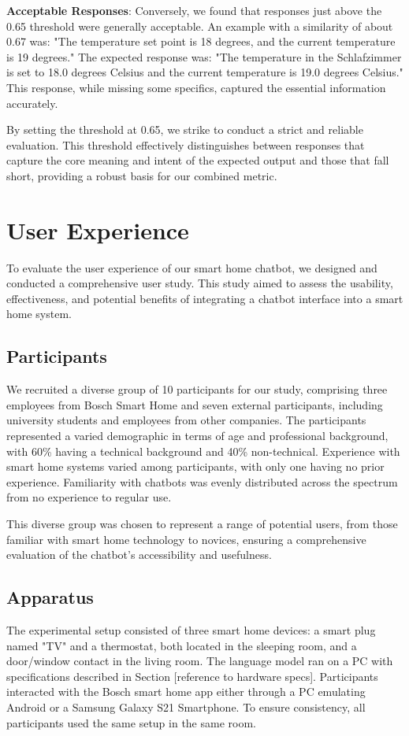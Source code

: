\textbf{Acceptable Responses}: Conversely, we found that responses just above the 0.65 threshold were generally acceptable. An example with a similarity of about 0.67 was: "The temperature set point is 18 degrees, and the current temperature is 19 degrees." The expected response was: "The temperature in the Schlafzimmer is set to 18.0 degrees Celsius and the current temperature is 19.0 degrees Celsius." This response, while missing some specifics, captured the essential information accurately.

By setting the threshold at 0.65, we strike to conduct a strict and reliable evaluation. This threshold effectively distinguishes between responses that capture the core meaning and intent of the expected output and those that fall short, providing a robust basis for our combined metric.



\section{User Experience}

To evaluate the user experience of our smart home chatbot, we designed and conducted a comprehensive user study. This study aimed to assess the usability, effectiveness, and potential benefits of integrating a chatbot interface into a smart home system.

\subsection{Participants}
We recruited a diverse group of 10 participants for our study, comprising three employees from Bosch Smart Home and seven external participants, including university students and employees from other companies. The participants represented a varied demographic in terms of age and professional background, with 60\% having a technical background and 40\% non-technical. Experience with smart home systems varied among participants, with only one having no prior experience. Familiarity with chatbots was evenly distributed across the spectrum from no experience to regular use.

This diverse group was chosen to represent a range of potential users, from those familiar with smart home technology to novices, ensuring a comprehensive evaluation of the chatbot's accessibility and usefulness.

\subsection{Apparatus}
The experimental setup consisted of three smart home devices: a smart plug named "TV" and a thermostat, both located in the sleeping room, and a door/window contact in the living room. The language model ran on a PC with specifications described in Section [reference to hardware specs]. Participants interacted with the Bosch smart home app either through a PC emulating Android or a Samsung Galaxy S21 Smartphone. To ensure consistency, all participants used the same setup in the same room.

